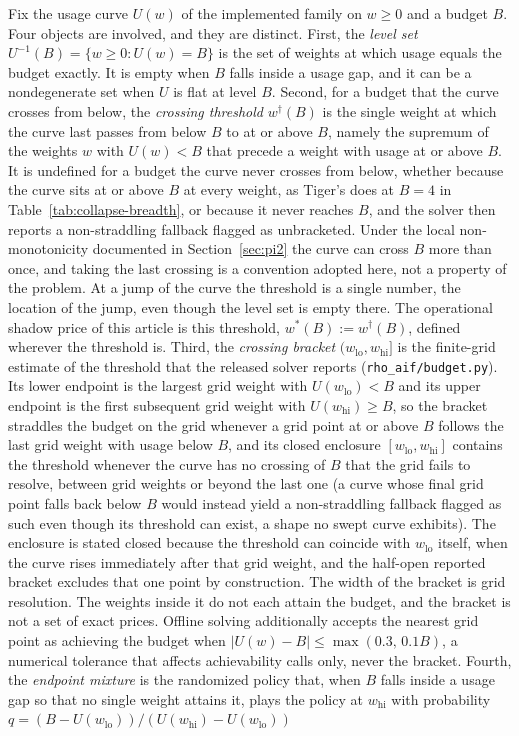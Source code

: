 \begin{definition}
\label{def:pi3}
Fix the usage curve $U(w)$ of the implemented family on $w \ge 0$ and a budget $B$. Four objects are involved, and they are distinct. First, the \emph{level set} $U^{-1}(B) = \{w \ge 0 : U(w) = B\}$ is the set of weights at which usage equals the budget exactly. It is empty when $B$ falls inside a usage gap, and it can be a nondegenerate set when $U$ is flat at level $B$. Second, for a budget that the curve crosses from below, the \emph{crossing threshold} $w^{\dagger}(B)$ is the single weight at which the curve last passes from below $B$ to at or above $B$, namely the supremum of the weights $w$ with $U(w) < B$ that precede a weight with usage at or above $B$. It is undefined for a budget the curve never crosses from below, whether because the curve sits at or above $B$ at every weight, as Tiger's does at $B{=}4$ in Table~\ref{tab:collapse-breadth}, or because it never reaches $B$, and the solver then reports a non-straddling fallback flagged as unbracketed. Under the local non-monotonicity documented in Section~\ref{sec:pi2} the curve can cross $B$ more than once, and taking the last crossing is a convention adopted here, not a property of the problem. At a jump of the curve the threshold is a single number, the location of the jump, even though the level set is empty there. The operational shadow price of this article is this threshold, $w^*(B) := w^{\dagger}(B)$, defined wherever the threshold is. Third, the \emph{crossing bracket} $(w_{\mathrm{lo}}, w_{\mathrm{hi}}]$ is the finite-grid estimate of the threshold that the released solver reports (\texttt{rho\_\allowbreak aif/\allowbreak budget.py}). Its lower endpoint is the largest grid weight with $U(w_{\mathrm{lo}}) < B$ and its upper endpoint is the first subsequent grid weight with $U(w_{\mathrm{hi}}) \geq B$, so the bracket straddles the budget on the grid whenever a grid point at or above $B$ follows the last grid weight with usage below $B$, and its closed enclosure $[w_{\mathrm{lo}}, w_{\mathrm{hi}}]$ contains the threshold whenever the curve has no crossing of $B$ that the grid fails to resolve, between grid weights or beyond the last one (a curve whose final grid point falls back below $B$ would instead yield a non-straddling fallback flagged as such even though its threshold can exist, a shape no swept curve exhibits). The enclosure is stated closed because the threshold can coincide with $w_{\mathrm{lo}}$ itself, when the curve rises immediately after that grid weight, and the half-open reported bracket excludes that one point by construction. The width of the bracket is grid resolution. The weights inside it do not each attain the budget, and the bracket is not a set of exact prices. Offline solving additionally accepts the nearest grid point as achieving the budget when $|U(w) - B| \leq \max(0.3,\, 0.1B)$, a numerical tolerance that affects achievability calls only, never the bracket. Fourth, the \emph{endpoint mixture} is the randomized policy that, when $B$ falls inside a usage gap so that no single weight attains it, plays the policy at $w_{\mathrm{hi}}$ with probability $q = (B - U(w_{\mathrm{lo}}))/(U(w_{\mathrm{hi}}) - U(w_{\mathrm{lo}}))$ 
\end{definition}
